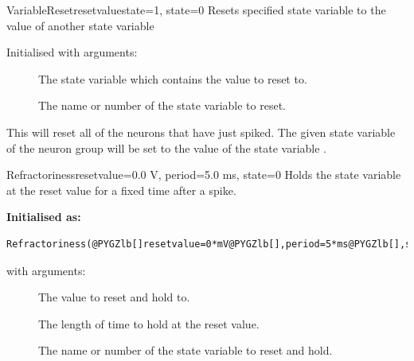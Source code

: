\documentclass[letterpaper,10pt,english]{manual}
\begin{document}
\hypertarget{brian.VariableReset}{}\begin{classdesc}{VariableReset}{resetvaluestate=1, state=0}
Resets specified state variable to the value of another state variable

Initialised with arguments:
\begin{description}
\item[]
The state variable which contains the value to reset to.

\item[]
The name or number of the state variable to reset.

\end{description}

This will reset all of the neurons that have just spiked. The
given state variable of the neuron group will be set to
the value of the state variable .
\end{classdesc}

\hypertarget{brian.Refractoriness}{}\begin{classdesc}{Refractoriness}{resetvalue=0.0 V, period=5.0 ms, state=0}
Holds the state variable at the reset value for a fixed time after a spike.

\textbf{Initialised as:}

\begin{Verbatim}[commandchars=@\[\]]
Refractoriness(@PYGZlb[]resetvalue=0*mV@PYGZlb[],period=5*ms@PYGZlb[],state=0@PYGZrb[]@PYGZrb[]@PYGZrb[])
\end{Verbatim}

with arguments:
\begin{description}
\item[]
The value to reset and hold to.

\item[]
The length of time to hold at the reset value.

\item[]
The name or number of the state variable to reset and hold.

\end{description}
\end{classdesc}
\end{document}
